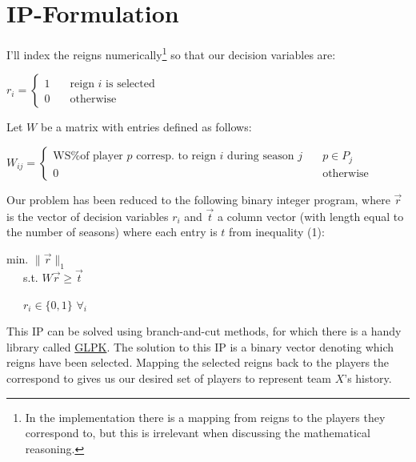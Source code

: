 \documentclass[a4paper,11pt]{article}
\newcommand{\norm}[1]{\lVert#1\rVert}
\begin{document}
\section{IP-Formulation}
I'll index the reigns numerically\footnote{In the implementation there is a mapping from reigns to the players they correspond to, but this is irrelevant when discussing the mathematical reasoning.} so that our decision variables are: 

\begin{center}
$r_{i} = \left\{ \begin{array}{ll}
		            1 & \quad \text{reign } i \text{ is selected}\\
		            0 & \quad \text{otherwise}
		        \end{array}
 		   \right. $
\end{center}


Let $W$ be a matrix with entries defined as follows:

\begin{center}
$W_{ij} = \left\{ \begin{array}{ll}
		            \text{WS\% of player $p$ corresp. to reign } i \text{ during season } j & \quad p \in P_j\\
		            0 & \quad \text{otherwise}
		        \end{array}
 		   \right. $
\end{center}

Our problem has been reduced to the following binary integer program, where $\vec{r}$ is the vector of decision variables $r_i$ and $\vec{t}$ a column vector (with length equal to the number of seasons) where each entry is $t$ from inequality (1): 

\begin{center}
    min. $\norm{\vec{r}}_1$\\

    \, \, \, s.t. $W\vec{r} \ge \vec{t}$
    
   \, \, \, $ r_i \in \{0,1\}$ \! $\forall_i$
\end{center}

This IP can be solved using branch-and-cut methods, for which there is a handy library called \href{http://www.gnu.org/software/glpk/}{GLPK}. The solution to this IP is a binary vector denoting which reigns have been selected. Mapping the selected reigns back to the players the correspond to gives us our desired set of players to represent team $X$'s history.
\end{document}
